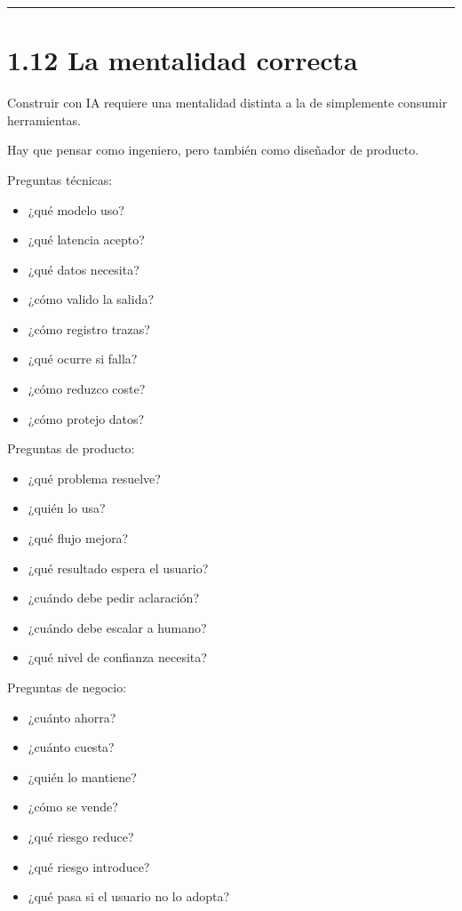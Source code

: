 \begin{center}\rule{0.5\linewidth}{0.5pt}\end{center}

\section{1.12 La mentalidad correcta}\label{la-mentalidad-correcta}

Construir con IA requiere una mentalidad distinta a la de simplemente
consumir herramientas.

Hay que pensar como ingeniero, pero también como diseñador de producto.

Preguntas técnicas:

\begin{itemize}
\tightlist
\item
  ¿qué modelo uso?
\item
  ¿qué latencia acepto?
\item
  ¿qué datos necesita?
\item
  ¿cómo valido la salida?
\item
  ¿cómo registro trazas?
\item
  ¿qué ocurre si falla?
\item
  ¿cómo reduzco coste?
\item
  ¿cómo protejo datos?
\end{itemize}

Preguntas de producto:

\begin{itemize}
\tightlist
\item
  ¿qué problema resuelve?
\item
  ¿quién lo usa?
\item
  ¿qué flujo mejora?
\item
  ¿qué resultado espera el usuario?
\item
  ¿cuándo debe pedir aclaración?
\item
  ¿cuándo debe escalar a humano?
\item
  ¿qué nivel de confianza necesita?
\end{itemize}

Preguntas de negocio:

\begin{itemize}
\tightlist
\item
  ¿cuánto ahorra?
\item
  ¿cuánto cuesta?
\item
  ¿quién lo mantiene?
\item
  ¿cómo se vende?
\item
  ¿qué riesgo reduce?
\item
  ¿qué riesgo introduce?
\item
  ¿qué pasa si el usuario no lo adopta?
\end{itemize}

